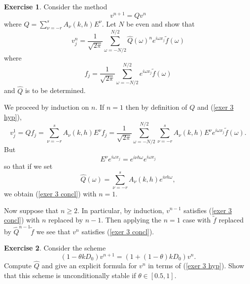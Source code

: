 \documentclass[10pt]{article}
\theoremstyle{definition}
\newtheorem{exer}{Exercise}
\begin{document}
\begin{exer}
Consider the method
$$v^{n + 1} = Qv^n$$
where $Q = \sum_{\nu = -r}^s A_\nu(k, h) E^\nu$. Let $N$ be even and show that
\begin{equation}\label{exer 3 concl}
v^n_j = \frac{1}{\sqrt{2\pi}} \sum_{\omega = -N/2}^{N/2} \hat Q(\omega)^n e^{i\omega x_j} \tilde f(\omega)
\end{equation}
where
\begin{equation}\label{exer 3 hyp}
f_j = \frac{1}{\sqrt{2\pi}} \sum_{\omega = -N/2}^{N/2} e^{i\omega x_j} \tilde f(\omega)
\end{equation}
and $\hat Q$ is to be determined.
\end{exer}

We proceed by induction on $n$.
If $n = 1$ then by definition of $Q$ and (\ref{exer 3 hyp}),
$$v^1_j = Qf_j = \sum_{\nu = -r}^s A_\nu(k, h) E^\nu f_j = \frac{1}{\sqrt{2\pi}} \sum_{\omega = -N/2}^{N/2} \sum_{\nu = -r}^s A_\nu(k, h) E^\nu e^{i\omega x_j} \tilde f(\omega).$$
But
$$E^\nu e^{i \omega x_j} = e^{i\nu h\omega} e^{i\omega x_j}$$
so that if we set
$$\hat Q(\omega) = \sum_{\nu = -r}^s A_\nu(k, h) e^{i\nu h \omega},$$
we obtain (\ref{exer 3 concl}) with $n = 1$.

Now suppose that $n \geq 2$.
In particular, by induction, $v^{n - 1}$ satisfies (\ref{exer 3 concl}) with $n$ replaced by $n - 1$.
Then applying the $n = 1$ case with $\tilde f$ replaced by $\hat Q^{n - 1} \tilde f$ we see that $v^n$ satisfies (\ref{exer 3 concl}).

\begin{exer}
Consider the scheme
$$(1 - \theta kD_0) v^{n + 1} = (1 + (1 - \theta)kD_0) v^n.$$
Compute $\hat Q$ and give an explicit formula for $v^n$ in terms of (\ref{exer 3 hyp}).
Show that this scheme is unconditionally stable if $\theta \in [0.5, 1]$.
\end{exer}
\end{document}
